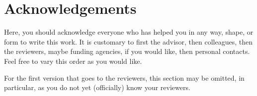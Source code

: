 \section*{Acknowledgements}

Here, you should acknowledge everyone who has helped you in any way, shape, or form to write this work.
It is customary to first the advisor, then colleagues, then the reviewers, maybe funding agencies, if you would like, then personal contacts.
Feel free to vary this order as you would like.

For the first version that goes to the reviewers, this section may be omitted, in particular, as you do not yet (officially) know your reviewers.

\cleardoublepage